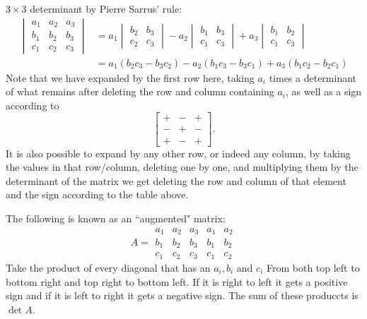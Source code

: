 \documentclass{article}
\begin{document}
\(3\times3\) determinant by Pierre Sarrus' rule:
\begin{align*}
    \begin{vmatrix}
        a_1 & a_2 & a_3\\
        b_1 & b_2 & b_3\\
        c_1 & c_2 & c_3
    \end{vmatrix}
    &= a_1
    \begin{vmatrix}
        b_2 & b_3\\
        c_2 & c_3
    \end{vmatrix}
    - a_2
    \begin{vmatrix}
        b_1 & b_3\\
        c_1 & c_3
    \end{vmatrix}
    + a_3
    \begin{vmatrix}
        b_1 & b_2\\
        c_1 & c_3
    \end{vmatrix}
    \\
    &= a_1(b_2c_3 - b_3c_2) - a_2(b_1c_3 - b_3c_1) + a_3(b_1c_2 - b_2c_1)
\end{align*}
Note that we have expanded by the first row here, taking \(a_i\) times a determinant of what remains after deleting the row and column containing \(a_i\), as well as a sign according to
\[
    \begin{bmatrix}
        + & - & +\\
        - & + & -\\
        + & - & +
    \end{bmatrix}
    .
\]
It is also possible to expand by any other row, or indeed any column, by taking the values in that row/column, deleting one by one, and multiplying them by the determinant of the matrix we get deleting the row and column of that element and the sign according to the table above.

The following is known as an ``augmented" matrix:
\[A=
\begin{array}{|ccc|cc|}
a_1 & a_2 & a_3 & a_1 & a_2\\
b_1 & b_2 & b_3 & b_1 & b_2\\
c_1 & c_2 & c_3 & c_1 & c_2
\end{array}
\]
Take the product of every diagonal that has an \(a_i,b_i\) and \(c_i\) From both top left to bottom right and top right to bottom left. If it is right to left it gets a positive sign and if it is left to right it gets a negative sign. The sum of these produccts is \(\det A\).
\end{document}
